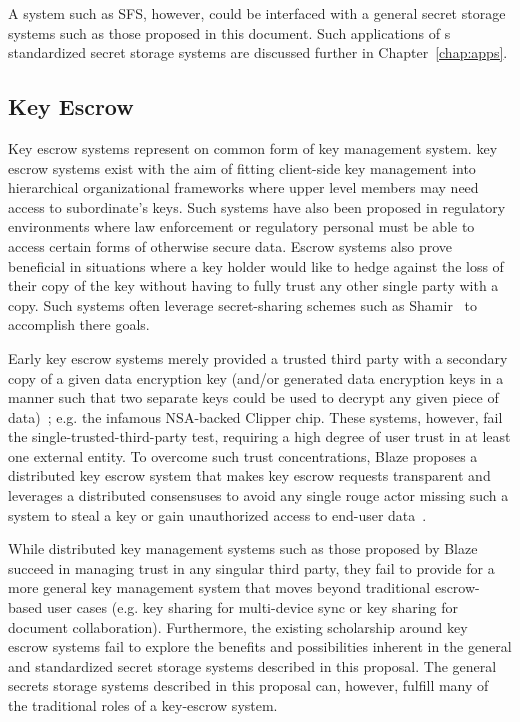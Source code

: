 A system such as SFS, however, could be interfaced with a general
secret storage systems such as those proposed in this document. Such
applications of s standardized secret storage systems are discussed
further in Chapter~\ref{chap:apps}.

\subsection{Key Escrow}

Key escrow systems represent on common form of key management system.
key escrow systems exist with the aim of fitting client-side key
management into hierarchical organizational frameworks where upper
level members may need access to subordinate's keys. Such systems have
also been proposed in regulatory environments where law enforcement or
regulatory personal must be able to access certain forms of otherwise
secure data. Escrow systems also prove beneficial in situations where
a key holder would like to hedge against the loss of their copy of the
key without having to fully trust any other single party with a
copy. Such systems often leverage secret-sharing schemes such as
Shamir~\cite{shamir1979} to accomplish there goals.

Early key escrow systems merely provided a trusted third party with a
secondary copy of a given data encryption key (and/or generated data
encryption keys in a manner such that two separate keys could be used
to decrypt any given piece of data)~\cite{denning1996}; e.g. the
infamous NSA-backed Clipper chip. These systems, however, fail the
single-trusted-third-party test, requiring a high degree of user trust
in at least one external entity. To overcome such trust
concentrations, Blaze proposes a distributed key escrow system that
makes key escrow requests transparent and leverages a distributed
consensuses to avoid any single rouge actor missing such a system to
steal a key or gain unauthorized access to end-user
data~\cite{blaze1996}.

While distributed key management systems such as those proposed by
Blaze succeed in managing trust in any singular third party, they fail
to provide for a more general key management system that moves beyond
traditional escrow-based user cases (e.g. key sharing for multi-device
sync or key sharing for document collaboration). Furthermore, the
existing scholarship around key escrow systems fail to explore the
benefits and possibilities inherent in the general and standardized
secret storage systems described in this proposal. The general secrets
storage systems described in this proposal can, however, fulfill many
of the traditional roles of a key-escrow system.

